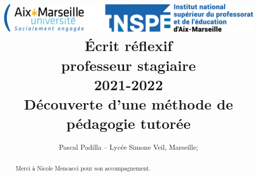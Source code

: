 \documentclass[a4paper, 12pt]{article}
\title{{\includegraphics[width=\linewidth]{res/inspe}}\\[2cm]
Écrit réflexif\\professeur stagiaire\\2021-2022 \\[4cm]
\textbf{Découverte d'une méthode de pédagogie tutorée}\\[2cm]
}
\author{Pascal Padilla -- Lyc\'ee Simone Veil, Marseille; \email{pascal.padilla@ax-aix-marseille.fr}}
\date{}
\begin{document}



\renewcommand{\labelitemi}{\textbullet}

\maketitle

\thispagestyle{empty}

\newpage
\begin{abstract}

Merci à Nicole Mencacci pour son accompagnement.

\end{abstract}

\thispagestyle{empty}

\newpage
\tableofcontents

\thispagestyle{empty}

\newpage
%
%

\clearpage
{}










% 

% 
\end{document}
